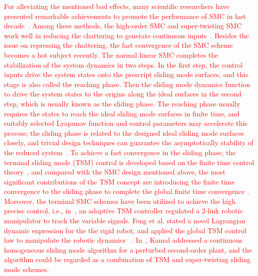 \documentclass[3p]{elsarticle}
\theoremstyle{plain}
\theoremstyle{remark}
\begin{document}
\textcolor{red}{For alleviating the mentioned bad effects, many scientific researchers have presented remarkable achievements to promote the performance of SMC in last decade~\cite{zong2013quasi,santiesteban2013time,mu2015continuous,evangelista2013lyapunov,gonzalez2014chattering,dadras2012fractional,zhao2013output}. Among these methods, the high-order SMC and super-twisting SMC work well in reducing the chattering to generate continuous inputs~\cite{castillo2015higher,palosz2015laser,edwards2016adaptive,zhao2015finite,liu2015second}. Besides the issue on repressing the chattering, the fast convergence of the SMC scheme becomes a hot subject recently. The normal linear SMC completes the stabilization of the system dynamics in two steps. In the first step, the control inputs drive the system states onto the prescript sliding mode  surfaces, and this stage is also called the reaching phase. Then the sliding mode dynamics function to drive the system states to the origins along the ideal surfaces in the second step, which is usually known as the sliding phase. The reaching phase usually requires the states to reach the ideal sliding mode surfaces in finite time, and suitably selected Lyapunov function and control parameters may accelerate this process; the sliding phase is related to the designed ideal sliding mode  surfaces closely, and trivial design techniques can guarantee the asymptotically stability of the reduced system~\cite{mu2016switching}. To achieve a fast convergence in the sliding phase, the terminal sliding mode (TSM) control is developed based on the finite time control theory~\cite{haimo1986finite,bhat1997finite}, and compared with the SMC design mentioned above, the most significant contributions of the TSM concept are introducing the finite time convergence to the sliding phase to complete the global finite time convergence~\cite{mu2016switching}. Moreover, the terminal SMC schemes have been utilized to achieve the high precise control, i.e., in~\cite{li2015robust}, an adaptive TSM controller regulated a $2$-link robotic manipulator to track the variable signals. Feng et al. stated a novel Lagrangian dynamic expression for the the rigid robot, and applied the global TSM control law to manipulate the robotic dynamics ~\cite{feng2002non}. In~\cite{kamal2016continuous}, Kamal addressed a continuous homogeneous sliding mode algorithm for a perturbed second-order plant, and the algorithm could be regarded as a combination of TSM and super-twisting sliding mode schemes.}
\end{document}
